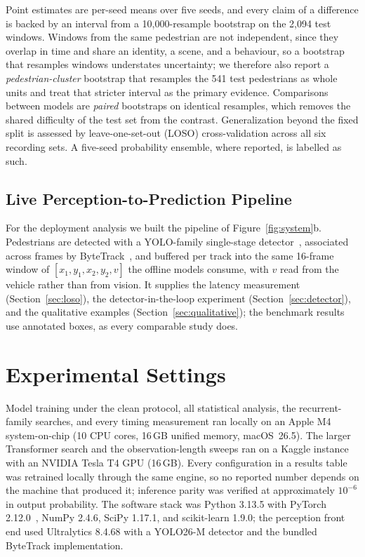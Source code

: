 \documentclass[mti,article,submit,moreauthors]{Definitions/mdpi}
\begin{document}
Point estimates are per-seed means over five seeds, and every claim of a difference is backed by an interval from a 10,000-resample bootstrap on the 2,094 test windows. Windows from the same pedestrian are not independent, since they overlap in time and share an identity, a scene, and a behaviour, so a bootstrap that resamples windows understates uncertainty; we therefore also report a \emph{pedestrian-cluster} bootstrap that resamples the 541 test pedestrians as whole units and treat that stricter interval as the primary evidence. Comparisons between models are \emph{paired} bootstraps on identical resamples, which removes the shared difficulty of the test set from the contrast. Generalization beyond the fixed split is assessed by leave-one-set-out (LOSO) cross-validation across all six recording sets. A five-seed probability ensemble, where reported, is labelled as such.

\subsection{Live Perception-to-Prediction Pipeline}
\label{sec:pipeline}

For the deployment analysis we built the pipeline of Figure~\ref{fig:system}b. Pedestrians are detected with a YOLO-family single-stage detector~\citep{jocher2025yolo}, associated across frames by ByteTrack~\citep{zhang2022bytetrack}, and buffered per track into the same 16-frame window of $[x_1, y_1, x_2, y_2, v]$ the offline models consume, with $v$ read from the vehicle rather than from vision. It supplies the latency measurement (Section~\ref{sec:loso}), the detector-in-the-loop experiment (Section~\ref{sec:detector}), and the qualitative examples (Section~\ref{sec:qualitative}); the benchmark results use annotated boxes, as every comparable study does.

\section{Experimental Settings}
\label{sec:settings}

Model training under the clean protocol, all statistical analysis, the recurrent-family searches, and every timing measurement ran locally on an Apple M4 system-on-chip (10 CPU cores, 16\,GB unified memory, macOS~26.5). The larger Transformer search and the observation-length sweeps ran on a Kaggle instance with an NVIDIA Tesla T4 GPU (16\,GB). Every configuration in a results table was retrained locally through the same engine, so no reported number depends on the machine that produced it; inference parity was verified at approximately $10^{-6}$ in output probability. The software stack was Python 3.13.5 with PyTorch 2.12.0~\citep{paszke2019pytorch}, NumPy 2.4.6, SciPy 1.17.1, and scikit-learn 1.9.0; the perception front end used Ultralytics 8.4.68 with a YOLO26-M detector and the bundled ByteTrack implementation.
\end{document}
